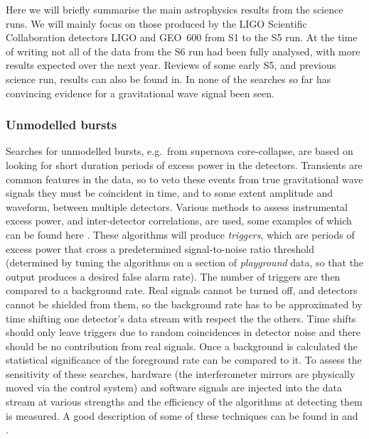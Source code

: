 \documentclass{article}
\begin{document}
Here we will briefly summarise the main astrophysics results from the science
runs. We will mainly focus on those produced by the LIGO Scientific
Collaboration \cite{LSCweb} detectors LIGO and GEO~600 from S1 to the S5 run. 
At the time of writing not all of the data from the S6 run had been fully
analysed, with more results expected over the next year. Reviews of some early
S5, and previous science run, results can also be found in\cite{Papa:2008,
Fairhurst:2009}. In none of the searches so far has convincing evidence for a
gravitational wave signal been seen.

\subsubsection{Unmodelled bursts}\label{subsubsection:unmodelled}
Searches for unmodelled bursts, e.g.~from supernova core-collapse, are based on
looking for short duration periods of excess power in the detectors. Transients
are common features in the data, so to veto these events from true gravitational
wave signals they must be coincident in time, and to some extent amplitude and
waveform, between multiple detectors. Various methods to assess instrumental
excess power, and inter-detector correlations, are used, some examples of which
can be found here \cite{Klimenko:2004, Anderson:2001, Searle:2008, McNabb:2004,
Cadonati:2004, Chatterji:2004, Chatterji:2006}. These algorithms will produce
{\it triggers}, which are periods of excess power that cross a predetermined
signal-to-noise ratio threshold (determined by tuning the algorithms on a
section of {\it playground} data, so that the output produces a desired false
alarm rate). The number of triggers are then compared to a background rate. Real
signals cannot be turned off, and detectors cannot be shielded from them, so the
background rate has to be approximated by time shifting one detector's data
stream with respect the the others. Time shifts should only leave triggers due
to random coincidences in detector noise and there should be no contribution
from real signals. Once a background is calculated the statistical significance
of the foreground rate can be compared to it. To assess the sensitivity of these
searches, hardware (the interferometer mirrors are physically moved via the
control system) and software signals are injected into the data stream at
various strengths and the efficiency of the algorithms at detecting them is
measured. A good description of some of these techniques can be found in
\cite{Abbott:2004b} and \cite{Abbott:2006a}.
\end{document}
